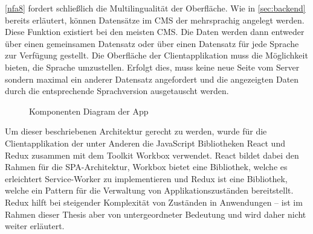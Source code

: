 \ref{nfa8} fordert schließlich die Multilingualität der Oberfläche. Wie in \autoref{sec:backend} 
bereits erläutert, können Datensätze im CMS der \shst{} mehrsprachig angelegt werden. Diese Funktion
existiert bei den meisten CMS. Die Daten werden dann entweder über einen gemeinsamen Datensatz oder über einen
Datensatz für jede Sprache zur Verfügung gestellt. Die Oberfläche der Clientapplikation muss die Möglichkeit
bieten, die Sprache umzustellen. Erfolgt dies, muss keine neue Seite vom Server sondern maximal ein anderer
Datensatz angefordert und die angezeigten Daten durch die entsprechende Sprachversion ausgetauscht werden.\\

\begin{figure}
    \centering
    
    \caption{Komponenten Diagram der \shst{} App}
    \label{fig:ss-app-class-diagram}
\end{figure}

Um dieser beschriebenen Architektur gerecht zu werden, wurde für die Clientapplikation der \shst{} 
unter Anderen die JavaScript Bibliotheken React \cite{react} und Redux \cite{redux} zusammen mit dem 
Toolkit Workbox \cite{workbox} verwendet. React bildet dabei
den Rahmen für die SPA-Architektur, Workbox bietet eine Bibliothek, welche es erleichtert 
Service-Worker zu implementieren und Redux ist eine Bibliothek, welche ein Pattern für die Verwaltung 
von Applikationszuständen bereitstellt. Redux hilft bei steigender Komplexität von 
Zuständen in Anwendungen -- ist im Rahmen dieser Thesis aber von untergeordneter Bedeutung und wird daher
nicht weiter erläutert.\\

